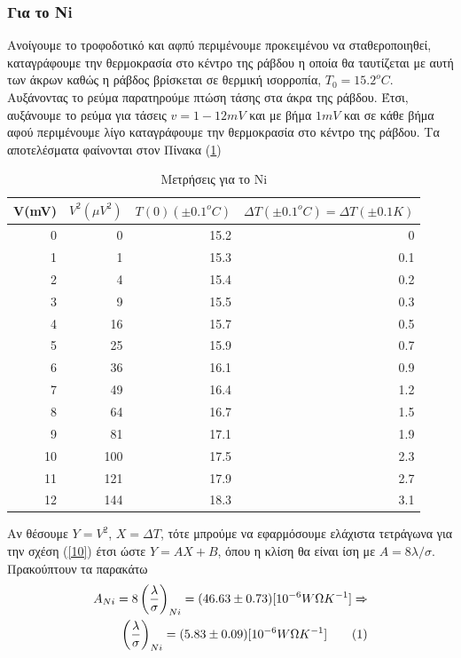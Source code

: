 \documentclass[a4paper]{article}
\newcommand\numberthis{\addtocounter{equation}{1}\tag{\theequation}}
\begin{document}
	\subsubsection*{Για το Νi}
		Ανοίγουμε το τροφοδοτικό και αφπύ περιμένουμε προκειμένου να σταθεροποιηθεί, καταγράφουμε την θερμοκρασία στο κέντρο της ράβδου η οποία θα ταυτίζεται με αυτή των άκρων καθώς η ράβδος βρίσκεται σε θερμική ισορροπία, $T_0=15.2^oC$. Αυξάνοντας το ρεύμα παρατηρούμε πτώση τάσης στα άκρα της ράβδου. Έτσι, αυξάνουμε το ρεύμα για τάσεις $v=1-12mV$ και με βήμα $1mV$ και σε κάθε βήμα αφού περιμένουμε λίγο καταγράφουμε την θερμοκρασία στο κέντρο της ράβδου. Τα αποτελέσματα φαίνονται στον Πίνακα (\ref{mat1}) 
		\begin{table}[h!]
			\centering
			\begin{tabular}{r|r|r|r}
				V(mV) & $V^2(\mu V^2)$ & $Τ(0) (\pm0.1^oC)$ & $\Delta T(\pm0.1^oC)=\Delta T(\pm0.1K)$ \\\hline\hline
				0&0&15.2&0\\
				1&1&15.3&0.1\\
				2&4&15.4&0.2\\
				3&9&15.5&0.3\\
				4&16&15.7&0.5\\
				5&25&15.9&0.7\\
				6&36&16.1&0.9\\
				7&49&16.4&1.2\\
				8&64&16.7&1.5\\
				9&81&17.1&1.9\\
				10&100&17.5&2.3\\
				11&121&17.9&2.7\\
				12&144&18.3&3.1
			\end{tabular}
			\caption{ Μετρήσεις για το Ni }
			\label{mat1}
		\end{table}
		
		Αν θέσουμε $Y=V^2$, $X=\Delta T$, τότε μπρούμε να εφαρμόσουμε ελάχιστα τετράγωνα για την σχέση (\ref{10}) έτσι ώστε $Y=AX+B$, όπου η κλίση θα είναι ίση με $A=8\lambda/\sigma$. Πρακούπτουν τα παρακάτω 
		\begin{align*}
			A_{Ni}= 8\left(\frac{\lambda}{\sigma}\right)_{Ni} = (  46.63 \pm 0.73  ) [10^{-6}W\Omega K^{-1} ] \Rightarrow \\
			\left(\frac{\lambda}{\sigma}\right)_{Ni}  = (  5.83 \pm 0.09  ) [10^{-6}W\Omega K^{-1} ] \numberthis
		\end{align*}
		
\end{document}
